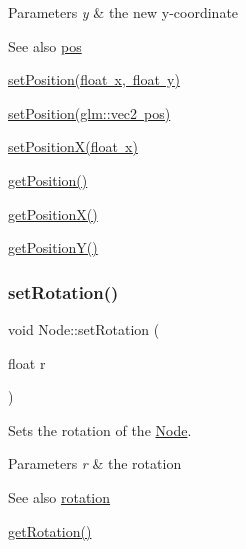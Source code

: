 \begin{DoxyParams}{Parameters}
{\em y} & the new y-\/coordinate \\
\hline
\end{DoxyParams}
\begin{DoxySeeAlso}{See also}
\mbox{\hyperlink{classsage_1_1Node_a7e0ae6eeb84fae60e54e6685c982b0b2}{pos}} 

\mbox{\hyperlink{classsage_1_1Node_aaa8545c103ef1b35e5076dbedab93af5}{set\+Position(float x, float y)}} 

\mbox{\hyperlink{classsage_1_1Node_ae2731cefe38e706c2bf21afae6da18b3}{set\+Position(glm\+::vec2 pos)}} 

\mbox{\hyperlink{classsage_1_1Node_ae1dfc73d6122a95778d5d9db3d1fd913}{set\+Position\+X(float x)}} 

\mbox{\hyperlink{classsage_1_1Node_a67eb5862f4da3cc4b2219a7e555a5678}{get\+Position()}} 

\mbox{\hyperlink{classsage_1_1Node_a17e92da5beaeb4b299c4e93729a22b1a}{get\+Position\+X()}} 

\mbox{\hyperlink{classsage_1_1Node_a26337a40b7da400233451b71e85759cc}{get\+Position\+Y()}} 
\end{DoxySeeAlso}
\mbox{\label{classsage_1_1Node_a422e877f5a830ad4d50b8e13250ee553}} 
\subsubsection{\texorpdfstring{setRotation()}{setRotation()}}
{\footnotesize\ttfamily void Node\+::set\+Rotation (\begin{DoxyParamCaption}\item[{float}]{r }\end{DoxyParamCaption})}



Sets the rotation of the \mbox{\hyperlink{classsage_1_1Node}{Node}}. 


\begin{DoxyParams}{Parameters}
{\em r} & the rotation \\
\hline
\end{DoxyParams}
\begin{DoxySeeAlso}{See also}
\mbox{\hyperlink{classsage_1_1Node_ae83b239ad4c722fee62708977e0560f4}{rotation}} 

\mbox{\hyperlink{classsage_1_1Node_aca7139bc3ea6705d41bb65a4fb7ddb6c}{get\+Rotation()}} 
\end{DoxySeeAlso}
\mbox{\label{classsage_1_1Node_a939698b2eb68ee5b60b91e2426e95369}} 
